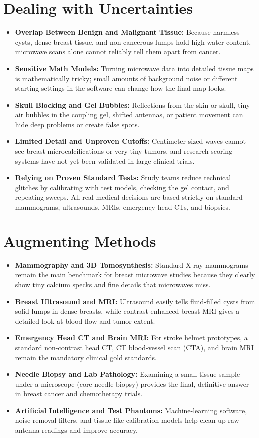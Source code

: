 \section{Dealing with Uncertainties}
\begin{itemize}
  \item \textbf{Overlap Between Benign and Malignant Tissue:} Because harmless cysts, dense breast tissue, and non-cancerous lumps hold high water content, microwave scans alone cannot reliably tell them apart from cancer.
  \item \textbf{Sensitive Math Models:} Turning microwave data into detailed tissue maps is mathematically tricky; small amounts of background noise or different starting settings in the software can change how the final map looks.
  \item \textbf{Skull Blocking and Gel Bubbles:} Reflections from the skin or skull, tiny air bubbles in the coupling gel, shifted antennas, or patient movement can hide deep problems or create false spots.
  \item \textbf{Limited Detail and Unproven Cutoffs:} Centimeter-sized waves cannot see breast microcalcifications or very tiny tumors, and research scoring systems have not yet been validated in large clinical trials.
  \item \textbf{Relying on Proven Standard Tests:} Study teams reduce technical glitches by calibrating with test models, checking the gel contact, and repeating sweeps. All real medical decisions are based strictly on standard mammograms, ultrasounds, MRIs, emergency head CTs, and biopsies.
\end{itemize}

\section{Augmenting Methods}
\begin{itemize}
  \item \textbf{Mammography and 3D Tomosynthesis:} Standard X-ray mammograms remain the main benchmark for breast microwave studies because they clearly show tiny calcium specks and fine details that microwaves miss.
  \item \textbf{Breast Ultrasound and MRI:} Ultrasound easily tells fluid-filled cysts from solid lumps in dense breasts, while contrast-enhanced breast MRI gives a detailed look at blood flow and tumor extent.
  \item \textbf{Emergency Head CT and Brain MRI:} For stroke helmet prototypes, a standard non-contrast head CT, CT blood-vessel scan (CTA), and brain MRI remain the mandatory clinical gold standards.
  \item \textbf{Needle Biopsy and Lab Pathology:} Examining a small tissue sample under a microscope (core-needle biopsy) provides the final, definitive answer in breast cancer and chemotherapy trials.
  \item \textbf{Artificial Intelligence and Test Phantoms:} Machine-learning software, noise-removal filters, and tissue-like calibration models help clean up raw antenna readings and improve accuracy.
\end{itemize}

